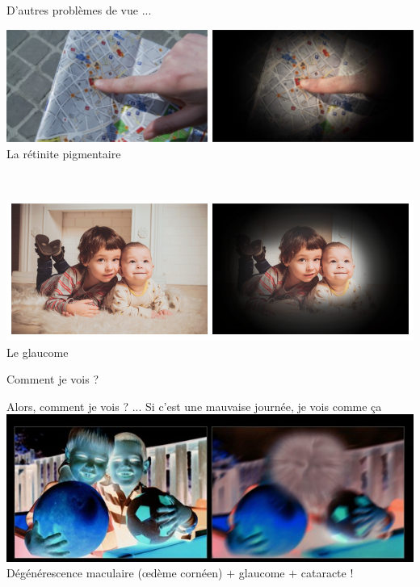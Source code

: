 \documentclass{beamer}
\begin{document}
\begin{frame}
 {D'autres problèmes de vue ... }

 \begin{center}
 \begin{minipage}{0.8\linewidth}
  \centering \includegraphics[width=1\linewidth]{images/visual_problem5.png}
  La r\'etinite pigmentaire
  \pause
 \end{minipage} \\ \vskip 0.8cm
 \begin{minipage}{0.8\linewidth}
  \centering \includegraphics[width=1\linewidth]{images/visual_problem6.png}
  Le glaucome
 \end{minipage}
 \end{center}

\end{frame}


\begin{frame}
 {Comment je vois ?}
 
 \vskip -0.4cm \small Alors, comment je vois ? ... Si c'est une mauvaise journ\'ee, je vois comme ça  \vskip 0.1cm
 \centering \includegraphics[width=0.75\linewidth]{images/visual_problem_neg.png}  \\
 D\'eg\'en\'erescence maculaire (œdème cornéen)
 \vskip 0.5cm \pause
 \centering $+$ glaucome $+$ cataracte ! 
  
\end{frame}
\end{document}
